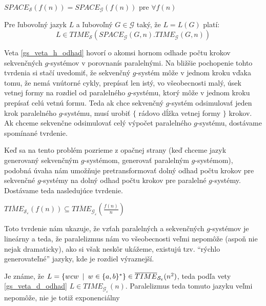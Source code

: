 \begin{veta}
  $SPACE_{\mathcal{S}}(f(n))=SPACE_{\mathcal{G}}(f(n))$ pre $\forall
  f(n)$
\end{veta}

\begin{veta}
  \label{gs_veta_h_odhad}
  Pre ľubovoľný jazyk $L$ a ľubovoľný
  $G\in\mathcal{G}$ taký, že $L=L(G)$ platí:
  \[
  L\in
  TIME_{\mathcal{S}}(SPACE_{\mathcal{G}}(G,n).TIME_{\mathcal{G}}(G,n))
  \]
\end{veta}

Veta \ref{gs_veta_h_odhad} hovorí o akomsi hornom odhade počtu  krokov
sekvenčných \mbox{$g$-sys}té\-mov v porovnaní\linebreak s
paralelnými. Na bližšie pochopenie tohto tvrdenia si stačí
uvedomiť, že sekvenčný $g$-systém môže v jednom kroku vďaka tomu,
že nemá vnútorné cykly, prepísať len istý, vo všeobecnosti malý,
úsek vetnej formy na rozdiel od paralelného $g$-systému, ktorý
môže v jednom kroku prepísať celú vetnú formu. Teda ak chce
sekvenčný $g$-systém odsimulovať jeden krok paralelného\linebreak
$g$-systému, musí urobiť $\{$ rádovo dĺžka vetnej formy $\}$
krokov. Ak chceme sekvenčne odsimulovať celý výpočet paralelného
$g$-systému, dostávame spomínané tvrdenie.

\smallskip
Keď sa na tento problém pozrieme z opačnej strany (keď chceme
jazyk generovaný sekvenčným $g$-systémom, generovať paralelným
$g$-systémom), podobná úvaha nám umožňuje pretransformovať dolný
odhad počtu krokov pre sekvenčné $g$-systémy na dolný odhad počtu
krokov pre paralelné $g$-systémy. Dostávame teda nasledujúce
tvrdenie.

\begin{veta}
  \label{gs_veta_d_odhad}
  $\overline{TIME}_{\mathcal{S_{\varepsilon}}}(f(n))\subseteq
  \overline{TIME}_{\mathcal{G_{\varepsilon}}}(\frac{f(n)}{n})$
\end{veta}

Toto tvrdenie nám ukazuje, že vzťah paralelných a sekvenčných
$g$-systémov je lineárny a teda, že paralelizmus nám vo
všeobecnosti veľmi nepomôže (aspoň nie nejak dramaticky), ako si
však neskôr ukážeme, existujú tzv. ``rýchlo generovateľné''
jazyky, kde je rozdiel výraznejší.

\begin{priklad}
  Je známe, že $L=\{wcw\enspace |\enspace
  w\in\{a,b\}^*\}\in\overline{TIME}_{\mathcal{S_{\varepsilon}}}(n^2)$,
  teda podľa vety \ref{gs_veta_d_odhad} $L\in
  TIME_{\mathcal{G_{\varepsilon}}}(n)$. Paralelizmus teda tomuto
  jazyku veľmi nepomôže, nie je totiž exponenciálny
\end{priklad}

